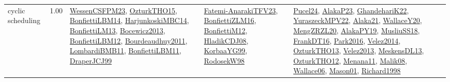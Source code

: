 {\begin{longtable}{p{3cm}r>{\raggedright\arraybackslash}p{6cm}>{\raggedright\arraybackslash}p{6cm}>{\raggedright\arraybackslash}p{8cm}}
\index{cyclic scheduling}\index{Concepts!cyclic scheduling}cyclic scheduling &  1.00 & \hyperref[detail:WessenCSFPM23]{WessenCSFPM23}, \hyperref[detail:OzturkTHO15]{OzturkTHO15}, \hyperref[detail:BonfiettiLBM14]{BonfiettiLBM14}, \hyperref[detail:HarjunkoskiMBC14]{HarjunkoskiMBC14}, \hyperref[detail:BonfiettiLM13]{BonfiettiLM13}, \hyperref[detail:Bocewicz2013]{Bocewicz2013}, \hyperref[detail:BonfiettiLBM12]{BonfiettiLBM12}, \hyperref[detail:Bourdeaudhuy2011]{Bourdeaudhuy2011}, \hyperref[detail:LombardiBMB11]{LombardiBMB11}, \hyperref[detail:BonfiettiLBM11]{BonfiettiLBM11}, \hyperref[detail:DraperJCJ99]{DraperJCJ99} & \hyperref[detail:Fatemi-AnarakiTFV23]{Fatemi-AnarakiTFV23}, \hyperref[detail:BonfiettiZLM16]{BonfiettiZLM16}, \hyperref[detail:BonfiettiM12]{BonfiettiM12}, \hyperref[detail:HladikCDJ08]{HladikCDJ08}, \hyperref[detail:KorbaaYG99]{KorbaaYG99}, \hyperref[detail:RodosekW98]{RodosekW98} & \hyperref[detail:Pucel24]{Pucel24}, \hyperref[detail:AlakaP23]{AlakaP23}, \hyperref[detail:GhandehariK22]{GhandehariK22}, \hyperref[detail:YuraszeckMPV22]{YuraszeckMPV22}, \hyperref[detail:Alaka21]{Alaka21}, \hyperref[detail:WallaceY20]{WallaceY20}, \hyperref[detail:MengZRZL20]{MengZRZL20}, \hyperref[detail:AlakaPY19]{AlakaPY19}, \hyperref[detail:MusliuSS18]{MusliuSS18}, \hyperref[detail:FrankDT16]{FrankDT16}, \hyperref[detail:Park2016]{Park2016}, \hyperref[detail:Velez2014]{Velez2014}, \hyperref[detail:OzturkTHO13]{OzturkTHO13}, \hyperref[detail:Velez2013]{Velez2013}, \hyperref[detail:MeskensDL13]{MeskensDL13}, \hyperref[detail:OzturkTHO12]{OzturkTHO12}, \hyperref[detail:Menana11]{Menana11}, \hyperref[detail:Malik08]{Malik08}, \hyperref[detail:Wallace06]{Wallace06}, \hyperref[detail:Mason01]{Mason01}, \hyperref[detail:Richard1998]{Richard1998}\\

\end{longtable}}
